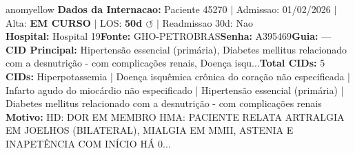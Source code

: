 \documentclass[a4paper,10pt]{article}
\begin{document}
\begin{anomalycard}[Internacao 164039 | GHO-PETROBRAS | MODERADO (z=2.06)]{anomyellow}
\textbf{Dados da Internacao:} Paciente 45270 $\mid$ Admissao: 01/02/2026 $\mid$ Alta: \textcolor{anomorange}{\textbf{EM CURSO}} $\mid$ LOS: \textbf{50d \textcolor{anomorange}{$\circlearrowleft$}} $\mid$ Readmissao 30d: Nao\\
\textbf{Hospital:} Hospital 19\quad\textbf{Fonte:} GHO-PETROBRAS\quad\textbf{Senha:} A395469\quad\textbf{Guia:} ---\\
\textbf{CID Principal:} {\small Hipertensão essencial (primária), Diabetes mellitus relacionado com a desnutrição - com complicações renais, Doença isqu...}\quad\textbf{Total CIDs:} 5\\

\textbf{CIDs:} {\scriptsize Hiperpotassemia | Doença isquêmica crônica do coração não especificada | Infarto agudo do miocárdio não especificado | Hipertensão essencial (primária) | Diabetes mellitus relacionado com a desnutrição - com complicações renais}\\

\textbf{Motivo:} {\scriptsize HD: DOR EM MEMBRO  HMA: PACIENTE RELATA ARTRALGIA EM JOELHOS (BILATERAL), MIALGIA EM MMII, ASTENIA E INAPETÊNCIA COM INÍCIO HÁ 0...}\\


\end{anomalycard}
\end{document}
